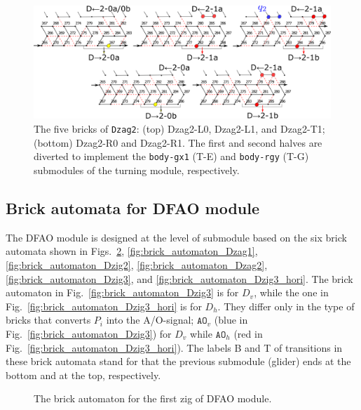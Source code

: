 \documentclass[runningheads]{llncs}
\begin{document}
\begin{figure}[h]
\centering
\includegraphics[width=\linewidth]{Figs/DFAO-zag2.png}  
\caption{The five bricks of \texttt{Dzag2}: (top) Dzag2-L0, Dzag2-L1, and Dzag2-T1; (bottom) Dzag2-R0 and Dzag2-R1. 
The first and second halves are diverted to implement the \texttt{body-gx1} (T-E) and \texttt{body-rgy} (T-G) submodules of the turning module, respectively.}
\label{fig:Dzag2}
\end{figure}

\clearpage

	\subsection{Brick automata for DFAO module}
	\label{ap_subsect:DFAO_module_BA}

The DFAO module is designed at the level of submodule based on the six brick automata shown in Figs.~\ref{fig:brick_automaton_Dzig1}, \ref{fig:brick_automaton_Dzag1}, \ref{fig:brick_automaton_Dzig2}, \ref{fig:brick_automaton_Dzag2}, \ref{fig:brick_automaton_Dzig3}, and \ref{fig:brick_automaton_Dzig3_hori}. 
The brick automaton in Fig.~\ref{fig:brick_automaton_Dzig3} is for $D_v$, while the one in Fig.~\ref{fig:brick_automaton_Dzig3_hori} is for $D_h$. 
They differ only in the type of bricks that converts $P_i$ into the A/O-signal; $\mathtt{AO}_v$ (blue in Fig.~\ref{fig:brick_automaton_Dzig3}) for $D_v$ while $\mathtt{AO}_h$ (red in Fig.~\ref{fig:brick_automaton_Dzig3_hori}). 
The labels B and T of transitions in these brick automata stand for that the previous submodule (glider) ends at the bottom and at the top, respectively. 

\begin{figure}[ht]
\centering
\caption{The brick automaton for the first zig of DFAO module.}
\label{fig:brick_automaton_Dzig1}
\end{figure}
\end{document}

